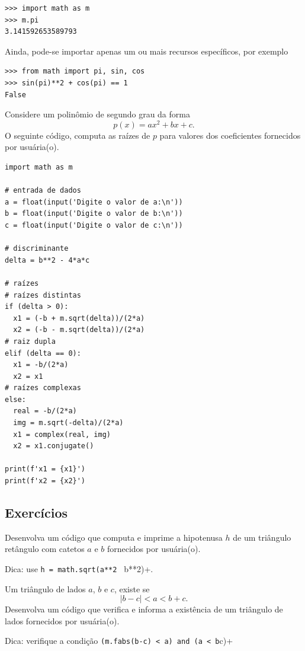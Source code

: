\begin{lstlisting}
>>> import math as m
>>> m.pi
3.141592653589793
\end{lstlisting}

Ainda, pode-se importar apenas um ou mais recursos específicos, por exemplo

\begin{lstlisting}
>>> from math import pi, sin, cos
>>> sin(pi)**2 + cos(pi) == 1
False
\end{lstlisting}

\begin{ex}
  Considere um polinômio de segundo grau da forma
  \begin{equation}
    p(x) = ax^2 + bx + c.
  \end{equation}
  O seguinte código, computa as raízes de $p$ para valores dos coeficientes fornecidos por usuária(o).

\begin{lstlisting}
import math as m

# entrada de dados
a = float(input('Digite o valor de a:\n'))
b = float(input('Digite o valor de b:\n'))
c = float(input('Digite o valor de c:\n'))

# discriminante
delta = b**2 - 4*a*c

# raízes
# raízes distintas
if (delta > 0):
  x1 = (-b + m.sqrt(delta))/(2*a)
  x2 = (-b - m.sqrt(delta))/(2*a)
# raiz dupla
elif (delta == 0):
  x1 = -b/(2*a)
  x2 = x1
# raízes complexas
else:
  real = -b/(2*a)
  img = m.sqrt(-delta)/(2*a)
  x1 = complex(real, img)
  x2 = x1.conjugate()

print(f'x1 = {x1}')
print(f'x2 = {x2}')
\end{lstlisting}

\end{ex}

\subsection{Exercícios}

\begin{exer}
  Desenvolva um código que computa e imprime a hipotenusa $h$ de um triângulo retângulo com catetos $a$ e $b$ fornecidos por usuária(o).
\end{exer}
\begin{resp}
  Dica: use \lstinline+h = math.sqrt(a**2 + b**2)+.
\end{resp}

\begin{exer}
  Um triângulo de lados $a$, $b$ e $c$, existe se
  \begin{equation}
    |b-c| < a < b + c.
  \end{equation}
  Desenvolva um código que verifica e informa a existência de um triângulo de lados fornecidos por usuária(o).
\end{exer}
\begin{resp}
  Dica: verifique a condição \lstinline+(m.fabs(b-c) < a) and (a < b+c)+
\end{resp}

